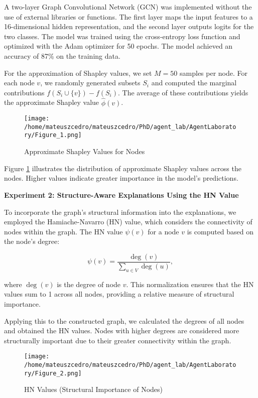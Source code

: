 \documentclass{article}
\begin{document}
A two-layer Graph Convolutional Network (GCN) was implemented without the use of external libraries or functions. The first layer maps the input features to a 16-dimensional hidden representation, and the second layer outputs logits for the two classes. The model was trained using the cross-entropy loss function and optimized with the Adam optimizer for 50 epochs. The model achieved an accuracy of 87\% on the training data.

For the approximation of Shapley values, we set $M = 50$ samples per node. For each node $v$, we randomly generated subsets $S_i$ and computed the marginal contributions $f(S_i \cup \{v\}) - f(S_i)$. The average of these contributions yields the approximate Shapley value $\hat{\phi}(v)$.

\begin{figure}[h]
\caption{Approximate Shapley Values for Nodes}
\centering
\texttt{[image: /home/mateuszcedro/mateuszcedro/PhD/agent\_lab/AgentLaboratory/Figure\_1.png]}
\label{fig:fig1}
\end{figure}

Figure \ref{fig:fig1} illustrates the distribution of approximate Shapley values across the nodes. Higher values indicate greater importance in the model's predictions.

\textbf{Experiment 2: Structure-Aware Explanations Using the HN Value}

To incorporate the graph's structural information into the explanations, we employed the Hamiache-Navarro (HN) value, which considers the connectivity of nodes within the graph. The HN value $\psi(v)$ for a node $v$ is computed based on the node's degree:

\[
\psi(v) = \frac{\deg(v)}{\sum_{u \in V} \deg(u)},
\]

where $\deg(v)$ is the degree of node $v$. This normalization ensures that the HN values sum to 1 across all nodes, providing a relative measure of structural importance.

Applying this to the constructed graph, we calculated the degrees of all nodes and obtained the HN values. Nodes with higher degrees are considered more structurally important due to their greater connectivity within the graph.

\begin{figure}[h]
\caption{HN Values (Structural Importance of Nodes)}
\centering
\texttt{[image: /home/mateuszcedro/mateuszcedro/PhD/agent\_lab/AgentLaboratory/Figure\_2.png]}
\label{fig:fig2}
\end{figure}
\end{document}
